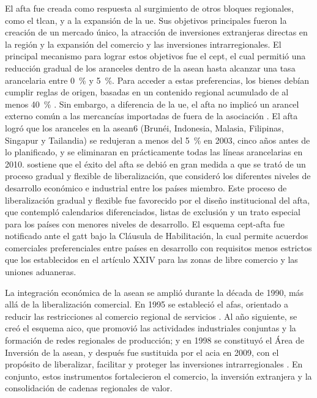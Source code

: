 El \gls{afta} fue creada como respuesta al surgimiento de otros bloques regionales, como el \gls{tlcan}, y a la expansión de la \gls{ue}. Sus objetivos principales fueron la creación de un mercado único, la atracción de inversiones extranjeras directas en la región y la expansión del comercio y las inversiones intrarregionales. El principal mecanismo para lograr estos objetivos fue el \gls{cept}, el cual permitió una reducción gradual de los aranceles dentro de la \gls{asean} hasta alcanzar una tasa arancelaria entre  0~\% y 5~\%. Para acceder a estas preferencias, los bienes debían cumplir reglas de origen, basadas en un contenido regional acumulado de al menos 40~\% \parencite{ASEAN_CEPT}. Sin embargo, a diferencia de la \gls{ue}, el \gls{afta} no implicó un arancel externo común a las mercancías importadas de fuera de la asociación \parencite{ASEAN_AFTA}. El \gls{afta} logró que los aranceles en la \gls{asean}6 (Brunéi, Indonesia, Malasia, Filipinas, Singapur y Tailandia) se redujeran a menos del 5~\% en 2003, cinco años antes de lo planificado, y se eliminaran en prácticamente todas las líneas arancelarias en 2010. \textcite{Ishikawa2021} sostiene que el éxito del \gls{afta} se debió en gran medida a que se trató de un proceso gradual y flexible de liberalización, que consideró los diferentes niveles de desarrollo económico e industrial entre los países miembro. Este proceso de liberalización gradual y flexible fue favorecido por el diseño institucional del \gls{afta}, que contempló calendarios diferenciados, listas de exclusión y un trato especial para los países con menores niveles de desarrollo. El esquema \gls{cept}-\gls{afta} fue notificado ante el \gls{gatt} bajo la Cláusula de Habilitación, la cual permite acuerdos comerciales preferenciales entre países en desarrollo con requisitos menos estrictos que los establecidos en el artículo XXIV para las zonas de libre comercio y las uniones aduaneras.

La integración económica de la \gls{asean} se amplió durante la década de 1990, más allá de la liberalización comercial. En 1995 se estableció el \gls{afas}, orientado a reducir las restricciones al comercio regional de servicios \parencite{ASEAN_services}. Al año siguiente, se creó el esquema \gls{aico}, que promovió las actividades industriales conjuntas y la formación de redes regionales de producción; y en 1998 se constituyó el Área de Inversión de la \gls{asean}, y después fue sustituida por el \gls{acia} en 2009, con el propósito de liberalizar, facilitar y proteger las inversiones intrarregionales \parencite[p.~16]{ASEAN_AIR2012}. En conjunto, estos instrumentos fortalecieron el comercio, la inversión extranjera y la consolidación de cadenas regionales de valor.

